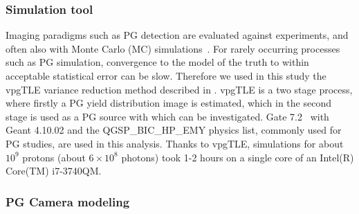 \documentclass[a4paper,english]{article}
\begin{document}
\subsubsection{Simulation tool}\label{sec:SimTool}

Imaging paradigms such as PG detection are evaluated against experiments, and often also with Monte Carlo (MC) simulations~\citep{Moteabbed2011,Gueth2013,Robert2013,Golnik2014a,Janssen2014}. For rarely occurring processes such as PG simulation, convergence to the model of the truth to within acceptable statistical error can be slow. Therefore we used in this study the vpgTLE variance reduction method described in \cite{Huisman2016}. vpgTLE is a two stage process, where firstly a PG yield distribution image is estimated, which in the second stage is used as a PG source with which  can be investigated. Gate 7.2~\citep{Sarrut2014} with Geant 4.10.02 and the QGSP\_BIC\_HP\_EMY physics list, commonly used for PG studies, are used in this analysis. Thanks to vpgTLE, simulations for about $10^9$ protons (about $6\times10^8$ photons) took 1-2 hours on a single core of an Intel(R) Core(TM) i7-3740QM.

\subsubsection{PG Camera modeling}\label{sec:camera}
\end{document}
